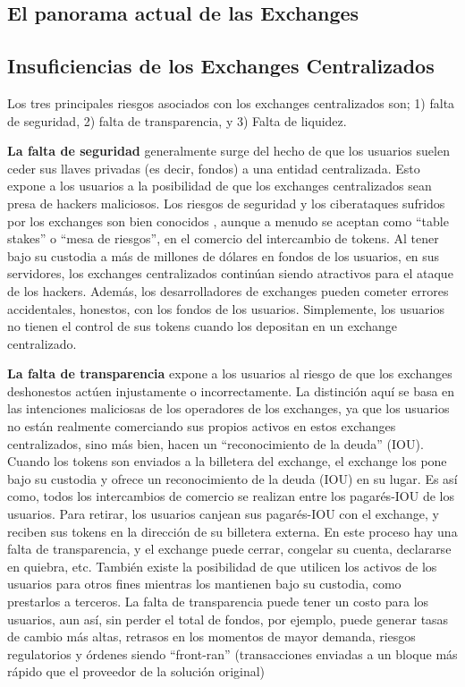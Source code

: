\documentclass[UTF8,nofonts]{article}
\begin{document}
\begin{multicols}{2}
\section{El panorama actual de las Exchanges\label{sec:current_exchange_landscape}}

\subsection{Insuficiencias de los Exchanges Centralizados}
Los tres principales riesgos asociados con los exchanges centralizados son; 1) falta de seguridad, 2) falta de transparencia, y 3) Falta de liquidez.

\textbf{La falta de seguridad} generalmente surge del hecho de que los usuarios suelen ceder sus llaves privadas (es decir, fondos) a una entidad centralizada. Esto expone a los usuarios a la posibilidad de que los exchanges centralizados sean presa de hackers maliciosos. Los riesgos de seguridad y los ciberataques sufridos por los exchanges son bien conocidos \cite{coincheckhack}  \cite{mcmillan2014inside}, aunque a menudo se aceptan como \enquote{table stakes} o \enquote{mesa de riesgos}, en el comercio del intercambio de tokens.
    Al tener bajo su custodia a m\'as de millones de d\'olares en fondos de los usuarios, en sus servidores, los exchanges centralizados contin\'uan siendo atractivos para el ataque de los hackers. Adem\'as, los desarrolladores de exchanges pueden cometer errores accidentales, honestos, con los fondos de los usuarios. Simplemente, los usuarios no tienen el control de sus tokens cuando los depositan en un exchange centralizado.

\textbf{La falta de transparencia} expone a los usuarios al riesgo de que los exchanges deshonestos act\'uen injustamente o incorrectamente. La distinci\'on aqu\'i se basa en las intenciones maliciosas de los operadores de los exchanges, ya que los usuarios no est\'an realmente comerciando sus propios activos en estos exchanges centralizados, sino m\'as bien, hacen un \enquote{reconocimiento de la deuda} (IOU). Cuando los tokens son enviados a la billetera del exchange, el exchange los pone bajo su custodia y ofrece un reconocimiento de la deuda (IOU) en su lugar. Es as\'i como, todos los intercambios de comercio se realizan entre los pagar\'es-IOU de los usuarios. Para retirar, los usuarios canjean sus pagar\'es-IOU con el exchange, y reciben sus tokens en la direcci\'on de su billetera externa. En este proceso hay una falta de transparencia, y el exchange puede cerrar, congelar su cuenta, declararse en quiebra, etc. Tambi\'en existe la posibilidad de que utilicen los activos de los usuarios para otros fines mientras los mantienen bajo su custodia, como prestarlos a terceros. La falta de transparencia puede tener un costo para los usuarios, aun as\'i, sin perder el total de fondos, por ejemplo, puede generar tasas de cambio m\'as altas, retrasos en los momentos de mayor demanda, riesgos regulatorios y \'ordenes siendo \enquote{front-ran} (transacciones enviadas a un bloque m\'as r\'apido que el proveedor de la soluci\'on original)


\end{multicols}
\end{document}
